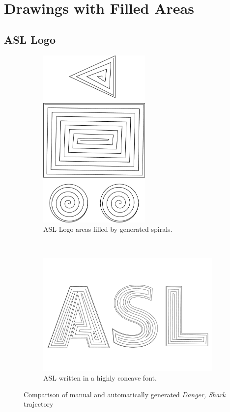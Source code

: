 \clearpage

\section{Drawings with Filled Areas}
\subsection{ASL Logo}

\begin{figure}[h]
\centering
\begin{subfigure}[t]{0.95\textwidth}
\centering
	\includegraphics[height=9cm]{images/results/asl/asl_logo_spiral.pdf}
	\caption{ASL Logo areas filled by generated spirals.}
\end{subfigure}\\
\begin{subfigure}[t]{0.95\textwidth}
	\includegraphics[width=\textwidth]{images/results/asl/asl_font.pdf}
	\caption{ASL written in a highly concave font.}
\end{subfigure}
\caption{Comparison of manual and automatically generated \textit{Danger, Shark} trajectory}
\end{figure}

